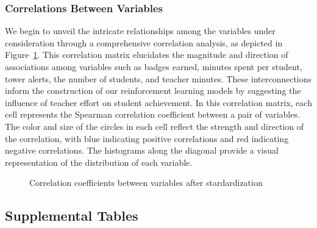\documentclass[
  number,
  preprint,
  3p,
  onecolumn]{elsarticle}
\begin{document}
\subsubsection{Correlations Between
Variables}\label{correlations-between-variables}

We begin to unveil the intricate relationships among the variables under
consideration through a comprehensive correlation analysis, as depicted
in Figure~\ref{fig-corr}. This correlation matrix elucidates the
magnitude and direction of associations among variables such as badges
earned, minutes spent per student, tower alerts, the number of students,
and teacher minutes. These interconnections inform the construction of
our reinforcement learning models by suggesting the influence of teacher
effort on student achievement. In this correlation matrix, each cell
represents the Spearman correlation coefficient between a pair of
variables. The color and size of the circles in each cell reflect the
strength and direction of the correlation, with blue indicating positive
correlations and red indicating negative correlations. The histograms
along the diagonal provide a visual representation of the distribution
of each variable.

\begin{figure}


\caption{\label{fig-corr}Correlation coefficients between variables
after stardardization}

\end{figure}%

\subsection{Supplemental Tables}\label{supplemental-tables}
\end{document}
